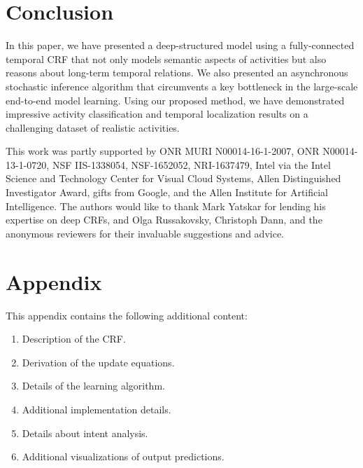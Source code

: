 \documentclass[10pt,twocolumn,letterpaper]{article}
\begin{document}
\section{Conclusion} 

In this paper, we have presented a deep-structured model using a fully-connected temporal CRF that not only models semantic aspects of activities but also reasons about long-term temporal relations. We also presented an asynchronous stochastic inference algorithm that circumvents a key bottleneck in the large-scale end-to-end model learning. Using our proposed method, we have demonstrated impressive activity classification and temporal localization results on a challenging dataset of realistic activities. 

{\footnotesize
{} This work was partly supported by ONR MURI N00014-16-1-2007, ONR N00014-13-1-0720, NSF IIS-1338054, NSF-1652052, NRI-1637479, Intel via the Intel Science and Technology Center for Visual Cloud Systems, Allen Distinguished Investigator Award, gifts from Google, and the Allen Institute for Artificial Intelligence. The authors would like to thank Mark Yatskar for lending his expertise on deep CRFs, and Olga Russakovsky, Christoph Dann, and the anonymous reviewers for their invaluable suggestions and advice.}

\balance

{\small


}




























\newpage
\onecolumn
\section{Appendix}
This appendix contains the following additional content:

\begin{enumerate}
\item Description of the CRF.
\item Derivation of the update equations.
\item Details of the learning algorithm.
\item Additional implementation details.
\item Details about intent analysis.
\item Additional visualizations of output predictions.
\end{enumerate}
\end{document}
